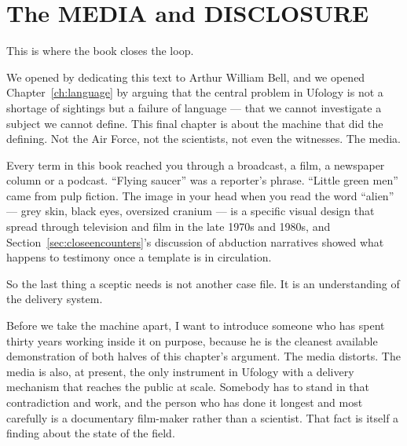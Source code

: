 \chapter{The MEDIA and DISCLOSURE}\label{ch:media}


This is where the book closes the loop.

We opened by dedicating this text to Arthur William Bell, and we opened Chapter~\ref{ch:language} by
arguing that the central problem in Ufology is not a shortage of sightings but a failure of language
--- that we cannot investigate a subject we cannot define. This final chapter is about the machine that
did the defining. Not the Air Force, not the scientists, not even the witnesses. The media.

Every term in this book reached you through a broadcast, a film, a newspaper column or a podcast.
``Flying saucer'' was a reporter's phrase. ``Little green men'' came from pulp fiction. The image in
your head when you read the word ``alien'' --- grey skin, black eyes, oversized cranium --- is a
specific visual design that spread through television and film in the late 1970s and 1980s, and
Section~\ref{sec:closeencounters}'s discussion of abduction narratives showed what happens to testimony once a template is
in circulation. 

So the last thing a sceptic needs is not another case file. It is an understanding of the delivery
system.

Before we take the machine apart, I want to introduce someone who has spent thirty years working
inside it on purpose, because he is the cleanest available demonstration of both halves of this
chapter's argument. The media distorts. The media is also, at present, the only instrument in
Ufology with a delivery mechanism that reaches the public at scale. Somebody has to stand in that
contradiction and work, and the person who has done it longest and most carefully is a documentary
film-maker rather than a scientist. That fact is itself a finding about the state of the field.

